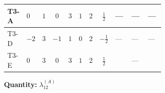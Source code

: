 \documentclass[8pt]{article}
\begin{document}
\begin{landscape}
\begin{longtable}{@{}llcccccc >{\raggedright\arraybackslash}p{0.21\linewidth} >{\raggedright\arraybackslash}p{0.21\linewidth} >{\raggedright\arraybackslash}p{0.21\linewidth}@{}}
\midrule
T3-A & $0$ & $1$ & $0$ & $3$ & $1$ & $2$ & $\frac{1}{2}$ & --- & --- & --- \\
\midrule
T3-D & $-2$ & $3$ & $-1$ & $1$ & $0$ & $2$ & $-\frac{1}{2}$ & --- & --- & --- \\
\midrule
T3-E & $0$ & $3$ & $0$ & $3$ & $1$ & $2$ & $\frac{1}{2}$ & \scriptsize\adjustbox{max width=\linewidth}{$\begin{gathered} -\frac{2}{9} {\lambda_5} \left({\lambda_5}\right)^{*}\end{gathered}$} & --- & \scriptsize\adjustbox{max width=\linewidth}{$\begin{gathered} -24 {g_2}^2 {\lambda_{12}^{(A)}}\end{gathered}$} \\
\midrule
\bottomrule
\end{longtable}
\clearpage
\noindent\textbf{Quantity: }$\lambda_{12}^{(A)}$\par\smallskip

\end{landscape}
\end{document}
